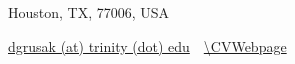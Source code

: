 
\Title{\CVAuthor}

\begin{SubTitle}
    {Houston, TX, 77006, USA}
    \par
    \href{mailto:dgrusak@trinity.edu}
    {dgrusak (at) trinity (dot) edu}
    \,\SubBulletSymbol\,
    \href{\CVWebpage}
    {\url{\CVWebpage}}
\end{SubTitle}